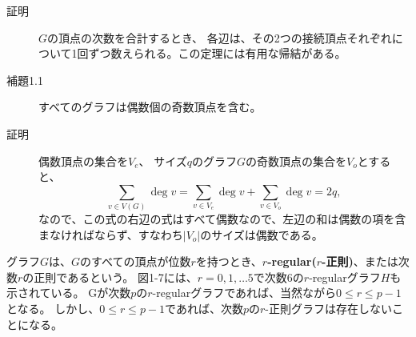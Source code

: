 
\begin{description}
  \item[証明] $G$の頂点の次数を合計するとき、
  各辺は、その2つの接続頂点それぞれについて1回ずつ数えられる。この定理には有用な帰結がある。

  \item[補題1.1] すべてのグラフは偶数個の奇数頂点を含む。 

  \item[証明] 偶数頂点の集合を$V_e$、
  サイズ$q$のグラフ$G$の奇数頂点の集合を$V_o$とすると、
  $$\sum_{v\in V(G)} \deg v = \sum_{v\in V_e} \deg v + \sum_{v\in V_o} \deg v = 2q,$$
  なので、この式の右辺の式はすべて偶数なので、左辺の和は偶数の項を含まなければならず、すなわち$|V_o|$のサイズは偶数である。
\end{description}

グラフ$G$は、$G$のすべての頂点が位数$r$を持つとき、\textbf{$r$-regular($r$-正則)}、または次数$r$の正則であるという。
図1-7には、$r = 0,1, \ldots 5$で次数6の$r$-regularグラフ$H$も示されている。
Gが次数$p$の$r$-regularグラフであれば、当然ながら$0 \leq r \leq p-1$となる。
しかし、$0 \leq r \leq p-1$であれば、次数$p$の$r$-正則グラフは存在しないことになる。